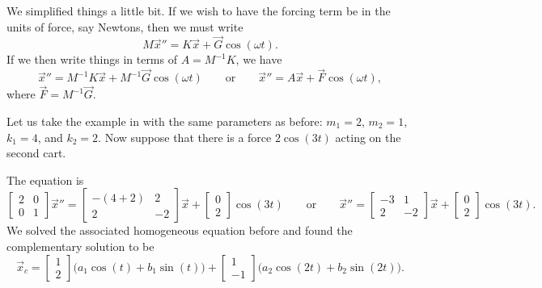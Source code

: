 We simplified things a little bit.  If we wish to have the
forcing term be in the units of force, say Newtons, then we must write
\begin{equation*}
M \vec{x}'' = K \vec{x} + \vec{G} \cos(\omega t) .
\end{equation*}
If we then write things in terms of $A = M^{-1} K$, we have
\begin{equation*}
\vec{x}'' = M^{-1}K \vec{x} + M^{-1} \vec{G} \cos(\omega t) 
\qquad \text{or} \qquad
\vec{x}'' = A \vec{x} + \vec{F} \cos(\omega t) ,
\end{equation*}
where $\vec{F} = M^{-1} \vec{G}$.

\begin{example}
Let us take the example in  with
the same parameters as before:
$m_1 = 2$, $m_2 = 1$, $k_1 = 4$, and $k_2 = 2$.  Now suppose that
there is a force $2 \cos (3t)$ acting on the second cart.

The equation is
\begin{equation*}
\begin{bmatrix}
2 & 0 \\
0 & 1
\end{bmatrix}
{\vec{x}}'' =
\begin{bmatrix}
-(4+2) & 2 \\
2 & -2
\end{bmatrix}
\vec{x} 
+ 
\begin{bmatrix}
0 \\ 2
\end{bmatrix}
\cos (3 t)
\qquad
\text{or}
\qquad
{\vec{x}}'' =
\begin{bmatrix}
-3 & 1 \\
2 & -2
\end{bmatrix}
\vec{x} 
+ 
\begin{bmatrix}
0 \\ 2
\end{bmatrix}
\cos (3 t) .
\end{equation*}
We solved the associated homogeneous equation before and found the
complementary solution to be
\begin{equation*}
\vec{x}_c =
\begin{bmatrix} 1 \\ 2 \end{bmatrix}
\bigl( a_1 \cos (t) + b_1 \sin (t) \bigr)
+
\begin{bmatrix} 1 \\ -1 \end{bmatrix}
\bigl( a_2 \cos (2t) + b_2 \sin (2t) \bigr) .
\end{equation*}


\end{example}
